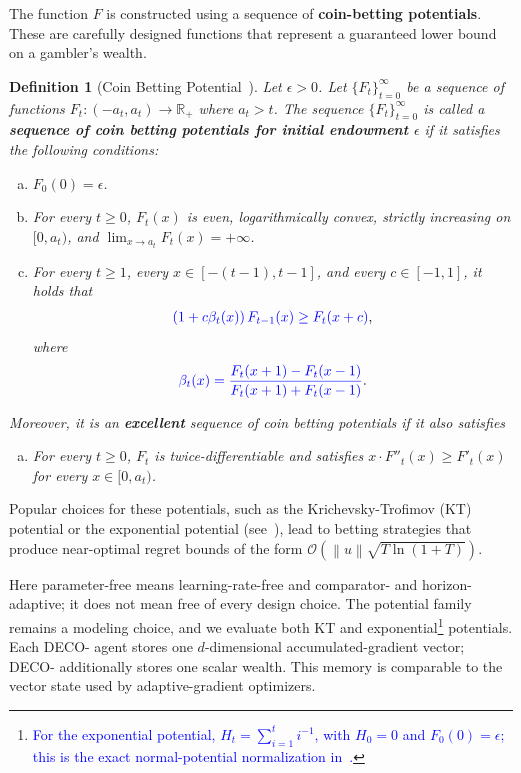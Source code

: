\documentclass[journal]{IEEEtran}
\newtheorem{definition}{Definition}
\newcommand{\br}[1]{\left(#1\right)}
\newcommand{\norm}[1]{\left\lVert{#1}\right\rVert}
\newcommand{\algname}{{DECO}\xspace}
\begin{document}
The function $F$ is constructed using a sequence of \textbf{coin-betting potentials}.
These are carefully designed functions that represent a guaranteed lower bound on a gambler's wealth.
\begin{definition}[Coin Betting Potential~\cite{orabona_coin_2016}]\label{def:potential}
    Let $\epsilon > 0$.
    Let ${\{ F_t \}}_{t=0}^\infty$ be a sequence of functions $F_t: (-a_t, a_t) \to \mathbb{R}_+$ where $a_t > t$.
    The sequence ${\{ F_t \}}_{t=0}^\infty$ is called a \textbf{sequence of coin betting potentials for initial endowment $\epsilon$} if it satisfies the following conditions:
    \begin{enumerate}[(a)]
        \item $F_0(0) = \epsilon$.
        \item For every $t \geq 0$, $F_t(x)$ is even, logarithmically convex, strictly increasing on $[0, a_t)$, and $\lim_{x \to a_t} F_t(x) = +\infty$. %
        \item For every $t \geq 1$, every $x \in [-(t-1), t-1]$, and every $c \in [-1,1]$, it holds that
              \begin{align}
                  {\color{blue}\br{1 + c \beta_t(x)} F_{t-1}(x) \geq F_t(x + c)},
              \end{align}
              where
              \begin{align}
                  {\color{blue}\beta_t(x) = \frac{F_t(x + 1) - F_t(x - 1)}{F_t(x + 1) + F_t(x - 1)}}.
              \end{align}
    \end{enumerate}
    Moreover, it is an \textbf{excellent} sequence of coin betting potentials if it also satisfies
    \begin{enumerate}[(d)]
        \item For every $t \geq 0$, $F_t$ is twice-differentiable and satisfies $x \cdot F''_t(x) \geq F'_t(x)$ for every $x \in [0, a_t)$. %
    \end{enumerate}
\end{definition}
Popular choices for these potentials, such as the Krichevsky-Trofimov (KT) potential or the exponential potential (see~), lead to betting strategies that produce near-optimal regret bounds of the form $\mathcal{O}(\norm{u}\sqrt{T \ln \br{1 + T}})$.
    {\color{blue}
        Here parameter-free means learning-rate-free and comparator- and horizon-adaptive; it does not mean free of every design choice.
        The potential family remains a modeling choice, and we evaluate both KT and exponential\footnote{\textcolor{blue}{For the exponential potential, $H_t=\sum_{i=1}^t i^{-1}$, with $H_0=0$ and $F_0(0)=\epsilon$; this is the exact normal-potential normalization in~\cite[Theorem 9]{orabona_coin_2016}.}} potentials.
        Each \algname{}- agent stores one $d$-dimensional accumulated-gradient vector; \algname{}- additionally stores one scalar wealth.
        This memory is comparable to the vector state used by adaptive-gradient optimizers.
        \par}
\end{document}
